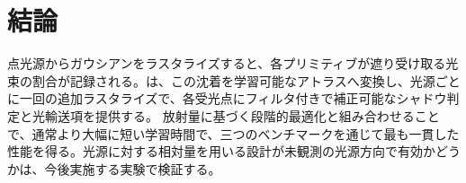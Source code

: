 \section{結論}
\label{sec:conclusion}

点光源からガウシアンをラスタライズすると、各プリミティブが遮り受け取る光束の割合が記録される。\ours は、この沈着を学習可能なアトラスへ変換し、光源ごとに一回の追加ラスタライズで、各受光点にフィルタ付きで補正可能なシャドウ判定と光輸送項を提供する。
放射量に基づく段階的最適化と組み合わせることで、通常より大幅に短い学習時間で、三つのベンチマークを通じて最も一貫した性能を得る。光源に対する相対量を用いる設計が未観測の光源方向で有効かどうかは、今後実施する実験で検証する。
